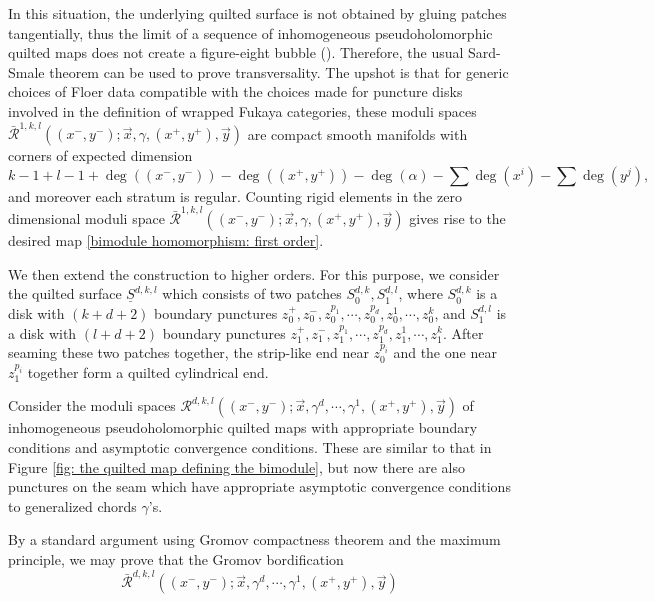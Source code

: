 \documentclass{amsart}
\numberwithin{equation}{section}
\numberwithin{figure}{section}
\begin{document}
	In this situation, the underlying quilted surface is not obtained by gluing patches tangentially, thus the limit of a sequence of inhomogeneous pseudoholomorphic quilted maps does not create a figure-eight bubble (\cite{Wehrheim-Woodward3}). Therefore, the usual Sard-Smale theorem can be used to prove transversality. The upshot is that for generic choices of Floer data compatible with the choices made for puncture disks involved in the definition of wrapped Fukaya categories, these moduli spaces $\bar{\mathcal{R}}^{1, k, l}((x^{-}, y^{-}); \vec{x}, \gamma, (x^{+}, y^{+}), \vec{y})$ are compact smooth manifolds with corners of expected dimension 
\begin{equation}
	k - 1 + l - 1 + \deg((x^{-}, y^{-})) - \deg((x^{+}, y^{+})) - \deg(\alpha) - \sum \deg(x^{i}) - \sum \deg(y^{j}),
\end{equation}
and moreover each stratum is regular. Counting rigid elements in the zero dimensional moduli space $\bar{\mathcal{R}}^{1, k, l}((x^{-}, y^{-}); \vec{x}, \gamma, (x^{+}, y^{+}), \vec{y})$ gives rise to the desired map \eqref{bimodule homomorphism: first order}. \par
	We then extend the construction to higher orders. For this purpose, we consider the quilted surface $\underline{S}^{d, k, l}$ which consists of two patches $S^{d, k}_{0}, S^{d, l}_{1}$, where $S^{d, k}_{0}$ is a disk with $(k+d+2)$ boundary punctures $z_{0}^{+}, z_{0}^{-}, z_{0}^{p_{1}}, \cdots, z_{0}^{p_{d}}, z_{0}^{1}, \cdots, z_{0}^{k}$, and $S^{d, l}_{1}$ is a disk with $(l+d+2)$ boundary punctures $z_{1}^{+}, z_{1}^{-}, z_{1}^{p_{1}}, \cdots, z_{1}^{p_{d}}, z_{1}^{1}, \cdots, z_{1}^{k}$. After seaming these two patches together, the strip-like end near $z_{0}^{p_{i}}$ and the one near $z_{1}^{p_{i}}$ together form a quilted cylindrical end. \par
	Consider the moduli spaces $\mathcal{R}^{d, k, l}((x^{-}, y^{-}); \vec{x}, \gamma^{d}, \cdots, \gamma^{1}, (x^{+}, y^{+}), \vec{y})$ of inhomogeneous pseudoholomorphic quilted maps with appropriate boundary conditions and asymptotic convergence conditions. These are similar to that in Figure \ref{fig: the quilted map defining the bimodule}, but now there are also punctures on the seam which have appropriate asymptotic convergence conditions to generalized chords $\gamma$'s. \par
	By a standard argument using Gromov compactness theorem and the maximum principle, we may prove that the Gromov bordification 
\begin{equation} \label{moduli space for defining higher order bimodule structure maps}
\bar{\mathcal{R}}^{d, k, l}((x^{-}, y^{-}); \vec{x}, \gamma^{d}, \cdots, \gamma^{1}, (x^{+}, y^{+}), \vec{y})
\end{equation}
\end{document}
